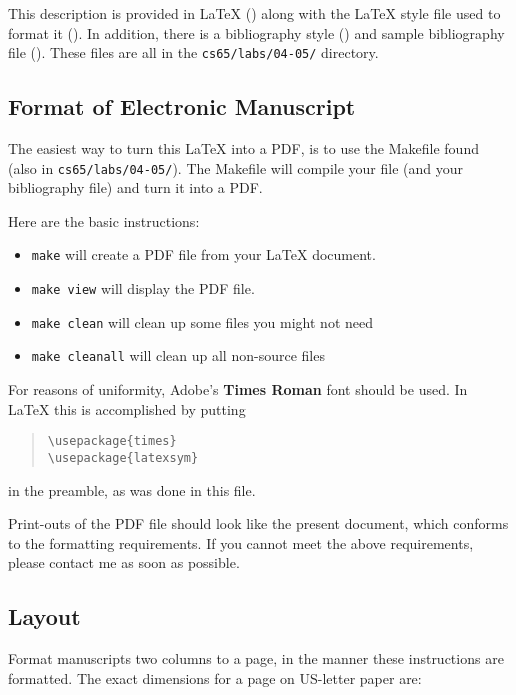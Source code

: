 \documentclass[11pt]{article}
\begin{document}
This description is provided in \LaTeX{} () along
with the \LaTeX{} style file used to format it
().  In addition, there is a bibliography style
() and sample bibliography file
().  These files are all in the {\tt cs65/labs/04-05/}
directory.

\subsection{Format of Electronic Manuscript}
\label{sect:pdf}

The easiest way to turn this \LaTeX{} into a PDF, is to use the
Makefile found (also in {\tt cs65/labs/04-05/}).  The Makefile will
compile your file (and your bibliography file) and turn it into a PDF.

Here are the basic instructions:
\begin{itemize}
\item {\tt make} will create a PDF file from your \LaTeX{} document.
\item {\tt make view} will display the PDF file. 
\item {\tt make clean} will clean up some files you might not need
\item {\tt make cleanall} will clean up all non-source files
\end{itemize}

For reasons of uniformity, Adobe's {\bf Times Roman} font should be
used. In \LaTeX{} this is accomplished by putting

\begin{quote}
\begin{verbatim}
\usepackage{times}
\usepackage{latexsym}
\end{verbatim}
\end{quote}
in the preamble, as was done in this file.

Print-outs of the PDF file should look like the present document,
which conforms to the formatting requirements. If you cannot meet the
above requirements, please contact me as soon as possible.

\subsection{Layout}
\label{ssec:layout}

Format manuscripts two columns to a page, in the manner these
instructions are formatted. The exact dimensions for a page on US-letter
paper are:
\end{document}
